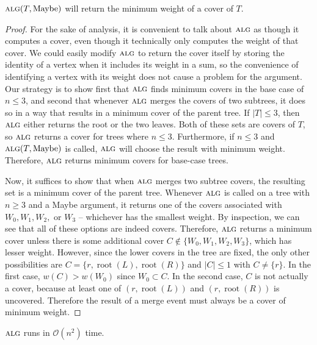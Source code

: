 \documentclass[11pt]{article}
\renewcommand{\O}{\mathcal{O}}
\newcommand{\alg}{\textsc{alg}}
\begin{document}
 $\alg(T, \operatorname{Maybe})$ will return the minimum weight of a cover of $T$.

\begin{proof}
  For the sake of analysis, it is convenient to talk about $\alg$ as though it computes a cover, even though it technically only computes the weight of that cover.
  We could easily modify $\alg$ to return the cover itself by storing the identity of a vertex when it includes its weight in a sum, so the convenience of identifying a vertex with its weight does not cause a problem for the argument.
  Our strategy is to show first that $\alg$ finds minimum covers in the base case of $n \leq 3$, and second that whenever $\alg$ merges the covers of two subtrees, it does so in a way that results in a minimum cover of the parent tree.
  If $|T| \leq 3$, then $\alg$ either returns the root or the two leaves.
  Both of these sets are covers of $T$, so $\alg$ returns a cover for trees where $n \leq 3$.
  Furthermore, if $n \leq 3$ and $\alg(T, \operatorname{Maybe})$ is called, $\alg$ will choose the result with minimum weight.
  Therefore, $\alg$ returns minimum covers for base-case trees.

  Now, it suffices to show that when $\alg$ merges two subtree covers, the resulting set is a minimum cover of the parent tree.
  Whenever $\alg$ is called on a tree with $n \geq 3$ and a Maybe argument, it returns one of the covers associated with $W_0, W_1, W_2,$ or $W_3$ -- whichever has the smallest weight.
  By inspection, we can see that all of these options are indeed covers.
  Therefore, $\alg$ returns a minimum cover unless there is some additional cover $C \notin \{W_0, W_1, W_2, W_3\}$, which has lesser weight.
  However, since the lower covers in the tree are fixed, the only other possibilities are $C = \{r, \operatorname{root}(L), \operatorname{root}(R)\}$ and $|C| \leq 1$ with $C \neq \{r\}$.
  In the first case, $w(C) > w(W_0)$ since $W_0 \subset C$.
  In the second case, $C$ is not actually a cover, because at least one of $(r, \operatorname{root}(L))$ and $(r, \operatorname{root}(R))$ is uncovered.
  Therefore the result of a merge event must always be a cover of minimum weight.
\end{proof}

 $\alg$ runs in $\O(n^2)$ time.
\end{document}
